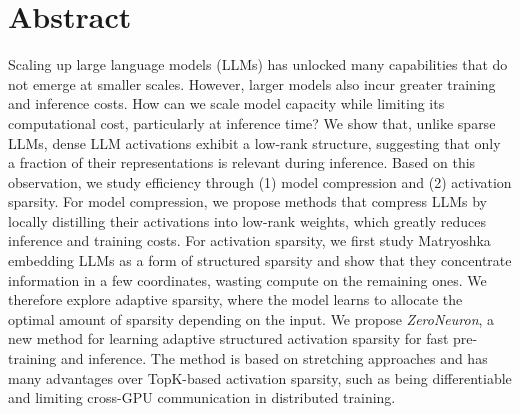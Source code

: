 \begingroup
\let\clearpage\relax
\let\cleardoublepage\relax
\let\cleardoublepage\relax

\chapter*{Abstract}
Scaling up large language models (LLMs) has unlocked many capabilities that do not
emerge at smaller scales. However, larger models also incur greater training and inference costs.
How can we scale model capacity while limiting its computational cost, particularly at inference time?
We show that, unlike sparse LLMs, dense LLM activations exhibit a low-rank structure,
suggesting that only a fraction of their representations is relevant during inference. 
Based on this observation, we study efficiency through (1) model compression and (2) activation sparsity.
For model compression, we propose methods that compress LLMs by locally distilling 
their activations into low-rank weights, which greatly reduces inference and training costs. 
For activation sparsity, we first study Matryoshka embedding LLMs as a form of
structured sparsity and show that they concentrate information in a few coordinates, 
wasting compute on the remaining ones. We therefore explore adaptive sparsity, 
where the model learns to allocate the optimal amount of sparsity depending on the input.
We propose \textit{ZeroNeuron}, a new method for learning adaptive structured activation sparsity for fast
pre-training and inference. The method is based on stretching approaches and has
many advantages over TopK-based activation sparsity, such as being differentiable and
limiting cross-GPU communication in distributed training.
\endgroup

\vfill
